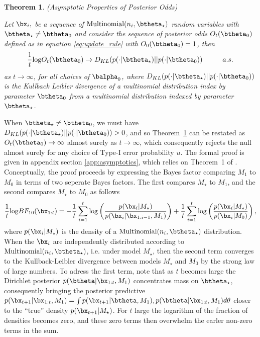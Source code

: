 \documentclass[11pt]{article}
\def\log{{\rm log}}
\newtheorem{thm}{Theorem}[section]
\begin{document}
\begin{thm}(Asymptotic Properties of Posterior Odds)
  
  \label{thm:consistency}
\noindent Let $\bx_i,$ be a sequence of $\text{Multinomial}(n_i,\btheta_{\star})$ random variables with $\btheta_{\star} \neq \btheta_0$ and consider the sequence of posterior odds $O_t(\btheta_0)$ defined as in equation \eqref{eq:update_rule} with $O_0(\btheta_0)=1$, then
\begin{equation}
  \label{eq:consistency}
  \frac{1}{t} \log O_t(\btheta_0) \rightarrow D_{KL}(p(\cdot|\btheta_{\star}) || p(\cdot|\btheta_0)) \hspace{1cm} a.s.
\end{equation}
as $t \rightarrow \infty$, for all choices of $\balpha_0$, where $D_{KL}(p(\cdot|\btheta_{\star}) || p(\cdot|\btheta_0))$ is the Kullback Leibler divergence of a multinomial distribution index by parameter $\btheta_0$ from a multinomial distribution indexed by parameter $\btheta_{\star}$.

\end{thm}
\noindent When $\btheta_{\star} \neq \btheta_0$, we must have $D_{KL}(p(\cdot|\btheta_{\star}) || p(\cdot|\btheta_0)) > 0$, and so Theorem~\ref{thm:consistency} can be restated as $O_t(\btheta_0) \rightarrow \infty$ almost surely as $t \rightarrow \infty$, which consequently rejects the null almost surely for any choice of Type-I error probability $u$.
The formal proof is given in appendix section \ref{app:asymptotics}, which relies on Theorem~1 of \cite{walker}.
Conceptually, the proof proceeds by expressing the Bayes factor comparing $M_1$ to $M_0$ in terms of two seperate Bayes factors.
The first compares $M_{\star}$ to $M_1$, and the second compares $M_{\star}$ to $M_0$ as follows
\begin{align*}
 \frac{1}{t} \log BF_{10}(\bx_{1:t}) = - \frac{1}{t}\sum_{i=1}^{t}\log \left( \frac{p(\bx_{i}|M_\star)}{p(\bx_{i}|\bx_{1:i-1},M_1)}\right) + \frac{1}{t}\sum_{i=1}^{t} \log  \left( \frac{p(\bx_{i}|M_\star)}{p(\bx_{i}|M_0)}\right),\\
\end{align*}
where  $p(\bx_i|M_\star)$ is the density of a $\text{Multinomial}(n_i,\btheta_{\star})$ distribution.
When the $\bx_i$ are independently distributed according to $\text{Multinomial}(n_i, \btheta_\star)$, i.e.
under model $M_\star$, then the second term converges to the Kullback-Leibler divergence between models $M_\star$ and $M_0$ by the strong law of large numbers.
To adress the first term, note that as $t$ becomes large the Dirichlet posterior $p(\btheta|\bx_{1:t}, M_1)$ concentrates mass on $\btheta_\star$, consequently bringing the posterior predictive $p(\bx_{t+1}|\bx_{1:t},M_1) =\int p(\bx_{t+1}|\btheta,M_1),p(\btheta|\bx_{1:t},M_1) d\theta$ closer to the ``true'' density $p(\bx_{t+1}|M_{\star})$.
For $t$ large the logarithm of the fraction of densities becomes zero, and these zero terms then overwhelm the earler non-zero terms in the sum.
\end{document}
